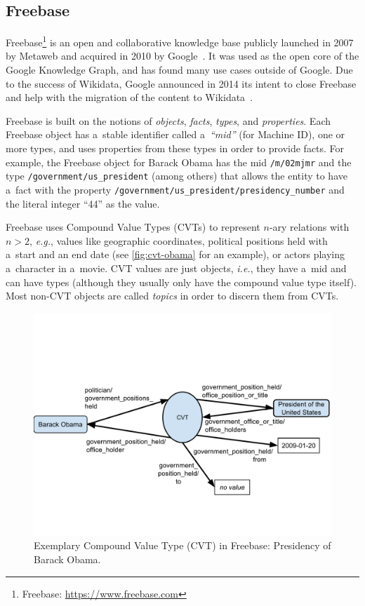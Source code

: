 \documentclass{sig-alternate-2013}
\begin{document}
\subsection{Freebase}

Freebase\footnote{Freebase: \url{https://www.freebase.com}} is an open and
collaborative knowledge base publicly launched in 2007 by Metaweb and
acquired in 2010 by Google~\cite{freebase}.
It was used as the open core of the Google Knowledge Graph,
and has found many use cases outside of Google.
Due to the success of Wikidata,
Google announced in 2014 its intent to close Freebase and help with
the migration of the content to Wikidata~\cite{freebase2014shutdown,freebase-end}.

Freebase is built on the notions of \emph{objects}, \emph{facts}, \emph{types}, and \emph{properties}.
Each Freebase object has a~stable identifier called a~\emph{``mid''} (for Machine ID),
one or more types, and uses properties from these types in order to provide facts.
For example, the Freebase object for Barack Obama has the mid \texttt{/m/02mjmr}
and the type \texttt{/government/us\_president} (among others) that allows the entity to have
a~fact with the property \texttt{/government/us\_president/presidency\_number} \linebreak
and the literal integer ``44'' as the value.

Freebase uses Compound Value Types (CVTs) to represent
$n$-ary relations with $n>2$, \emph{e.g.}, values like geographic coordinates,
political positions held with a~start and an end date (see \autoref{fig:cvt-obama} for an example),
or actors playing a~character in a~movie.
CVT values are just objects, \emph{i.e.}, they have a~mid and can have types
(although they usually only have the compound value type itself).
Most non-CVT objects are called \emph{topics} in order to discern them from CVTs.

\begin{figure}[!htbp]
  \centering
  \includegraphics[trim=0cm 3cm 0cm 5cm, width=8.45 cm]{img/freebase-cvt-obama.pdf}
  \caption{Exemplary Compound Value Type (CVT) in Freebase: Presidency of Barack Obama.}
  \label{fig:cvt-obama}
\end{figure}
\end{document}
